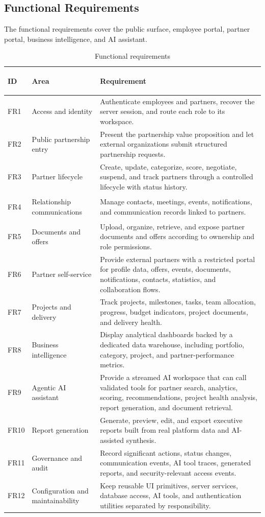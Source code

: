 \subsection{Functional Requirements}
The functional requirements cover the public surface, employee portal, partner portal, business intelligence, and AI assistant.

\begin{table}[H]
  \centering
  \caption{Functional requirements}
  \begin{tabularx}{\textwidth}{>{\bfseries\raggedright\arraybackslash}p{1.2cm}>{\raggedright\arraybackslash}p{3.4cm}X}
    \toprule
    ID & Area & Requirement \\
    \midrule
    FR1 & Access and identity & Authenticate employees and partners, recover the server session, and route each role to its workspace. \\
    FR2 & Public partnership entry & Present the partnership value proposition and let external organizations submit structured partnership requests. \\
    FR3 & Partner lifecycle & Create, update, categorize, score, negotiate, suspend, and track partners through a controlled lifecycle with status history. \\
    FR4 & Relationship communications & Manage contacts, meetings, events, notifications, and communication records linked to partners. \\
    FR5 & Documents and offers & Upload, organize, retrieve, and expose partner documents and offers according to ownership and role permissions. \\
    FR6 & Partner self-service & Provide external partners with a restricted portal for profile data, offers, events, documents, notifications, contacts, statistics, and collaboration flows. \\
    FR7 & Projects and delivery & Track projects, milestones, tasks, team allocation, progress, budget indicators, project documents, and delivery health. \\
    FR8 & Business intelligence & Display analytical dashboards backed by a dedicated data warehouse, including portfolio, category, project, and partner-performance metrics. \\
    FR9 & Agentic AI assistant & Provide a streamed AI workspace that can call validated tools for partner search, analytics, scoring, recommendations, project health analysis, report generation, and document retrieval. \\
    FR10 & Report generation & Generate, preview, edit, and export executive reports built from real platform data and AI-assisted synthesis. \\
    FR11 & Governance and audit & Record significant actions, status changes, communication events, AI tool traces, generated reports, and security-relevant access events. \\
    FR12 & Configuration and maintainability & Keep reusable UI primitives, server services, database access, AI tools, and authentication utilities separated by responsibility. \\
    \bottomrule
  \end{tabularx}
\end{table}
